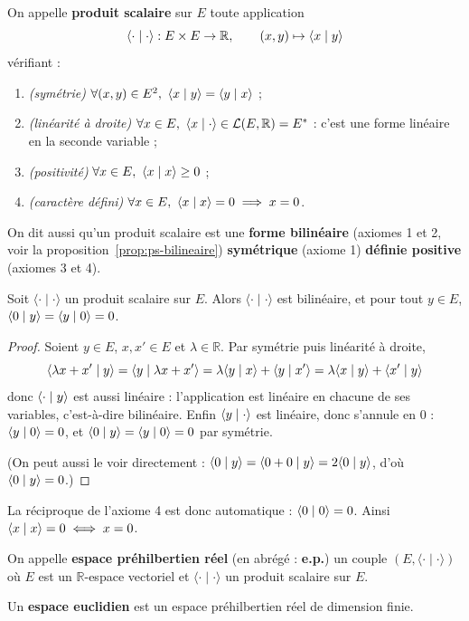 \begin{defi}
\label{defi:produit-scalaire}
On appelle \textbf{produit scalaire} sur $E$ toute application
\[\langle\cdot\mid\cdot\rangle : E\times E\to\mathbb{R},\qquad (x,y)\mapsto\langle x\mid y\rangle\]
vérifiant :
\begin{enumerate}
\item \emph{(symétrie)} $\forall (x,y)\in E^2,\ \langle x\mid y\rangle=\langle y\mid x\rangle$ ;
\item \emph{(linéarité à droite)} $\forall x\in E,\ \langle x\mid \cdot\rangle\in\mathcal{L}(E,\mathbb{R})=E^*$ : c'est une forme linéaire en la seconde variable ;
\item \emph{(positivité)} $\forall x\in E,\ \ps{x}{x}\geq 0$ ;
\item \emph{(caractère défini)} $\forall x\in E,\ \langle x\mid x\rangle=0\implies x=0$.
\end{enumerate}
On dit aussi qu'un produit scalaire est une \textbf{forme bilinéaire} (axiomes 1 et 2, voir la proposition~\ref{prop:ps-bilineaire}) \textbf{symétrique} (axiome 1) \textbf{définie positive} (axiomes 3 et 4).
\end{defi}

\begin{prop}
\label{prop:ps-bilineaire}
Soit $\langle\cdot\mid\cdot\rangle$ un produit scalaire sur $E$. Alors $\langle\cdot\mid\cdot\rangle$ est bilinéaire, et pour tout $y\in E$, $\langle 0\mid y\rangle=\langle y\mid 0\rangle=0$.
\end{prop}

\begin{proof}
Soient $y\in E$, $x,x'\in E$ et $\lambda\in\mathbb{R}$. Par symétrie puis linéarité à droite,
\[\langle \lambda x+x'\mid y\rangle=\langle y\mid \lambda x+x'\rangle=\lambda\langle y\mid x\rangle+\langle y\mid x'\rangle=\lambda\langle x\mid y\rangle+\langle x'\mid y\rangle\]
donc $\langle \cdot\mid y\rangle$ est aussi linéaire : l'application est linéaire en chacune de ses variables, c'est-à-dire bilinéaire. Enfin $\langle y\mid \cdot\rangle$ est linéaire, donc s'annule en $0$ : $\langle y\mid 0\rangle=0$, et $\langle 0\mid y\rangle=\langle y\mid 0\rangle=0$ par symétrie.

(On peut aussi le voir directement : $\langle 0\mid y\rangle=\langle 0+0\mid y\rangle=2\langle 0\mid y\rangle$, d'où $\langle 0\mid y\rangle=0$.)
\end{proof}

\begin{remarque}
La réciproque de l'axiome 4 est donc automatique : $\langle 0\mid 0\rangle=0$. Ainsi $\langle x\mid x\rangle=0\iff x=0$.
\end{remarque}

\begin{defi}
\label{defi:prehilbertien}
On appelle \textbf{espace préhilbertien réel} (en abrégé : \textbf{e.p.}) un couple $(E,\langle\cdot\mid\cdot\rangle)$ où $E$ est un $\mathbb{R}$-espace vectoriel et $\langle\cdot\mid\cdot\rangle$ un produit scalaire sur $E$.

Un \textbf{espace euclidien} est un espace préhilbertien réel de dimension finie.
\end{defi}

